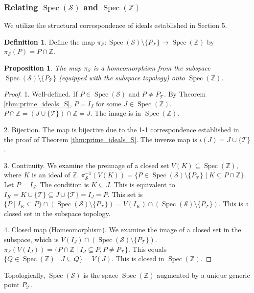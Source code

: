 \documentclass[11pt, a4paper]{article}
\theoremstyle{plain}
\newtheorem{proposition}[theorem]{Proposition}
\theoremstyle{definition}
\newtheorem{definition}[theorem]{Definition}
\numberwithin{equation}{section}
\newcommand{\Z}{\mathbb{Z}}
\newcommand{\Tobj}{\mathcal{T}} %
\newcommand{\SemiringS}{\mathcal{S}}
\DeclareMathOperator{\Spec}{Spec}
\begin{document}
\subsubsection{Relating $\Spec(\SemiringS)$ and $\Spec(\Z)$}

We utilize the structural correspondence of ideals established in Section 5.

\begin{definition}\label{def:map_SpecS_to_SpecZ}
Define the map $\pi_{\SemiringS}: \Spec(\SemiringS) \setminus \{P_{\Tobj}\} \to \Spec(\Z)$ by $\pi_{\SemiringS}(P) = P \cap \Z$.
\end{definition}

\begin{proposition}\label{prop:map_SpecS_to_SpecZ_properties}
The map $\pi_{\SemiringS}$ is a homeomorphism from the subspace $\Spec(\SemiringS) \setminus \{P_{\Tobj}\}$ (equipped with the subspace topology) onto $\Spec(\Z)$.
\end{proposition}
\begin{proof}
1. Well-defined. If $P \in \Spec(\SemiringS)$ and $P \neq P_{\Tobj}$. By Theorem \ref{thm:prime_ideals_S}, $P=I_J$ for some $J \in \Spec(\Z)$. $P\cap\Z = (J\cup\{\Tobj\}) \cap \Z = J$. The image is in $\Spec(\Z)$.

2. Bijection. The map is bijective due to the 1-1 correspondence established in the proof of Theorem \ref{thm:prime_ideals_S}. The inverse map is $\iota(J) = J\cup\{\Tobj\}$.

3. Continuity. We examine the preimage of a closed set $V(K) \subseteq \Spec(\Z)$, where $K$ is an ideal of $\Z$.
$\pi_{\SemiringS}^{-1}(V(K)) = \{P \in \Spec(\SemiringS)\setminus\{P_{\Tobj}\} \mid K \subseteq P\cap\Z\}$.
Let $P=I_J$. The condition is $K \subseteq J$.
This is equivalent to $I_K = K\cup\{\Tobj\} \subseteq J\cup\{\Tobj\} = I_J = P$.
This set is $\{P \mid I_K \subseteq P\} \cap (\Spec(\SemiringS)\setminus\{P_{\Tobj}\}) = V(I_K) \cap (\Spec(\SemiringS)\setminus\{P_{\Tobj}\})$. This is a closed set in the subspace topology.

4. Closed map (Homeomorphism). We examine the image of a closed set in the subspace, which is $V(I_J) \cap (\Spec(\SemiringS)\setminus\{P_{\Tobj}\})$.
$\pi_{\SemiringS}(V(I_J)) = \{P\cap\Z \mid I_J \subseteq P, P\neq P_{\Tobj}\}$.
This equals $\{Q \in \Spec(\Z) \mid J \subseteq Q\} = V(J)$. This is closed in $\Spec(\Z)$.
\end{proof}

Topologically, $\Spec(\SemiringS)$ is the space $\Spec(\Z)$ augmented by a unique generic point $P_{\Tobj}$.
\end{document}
